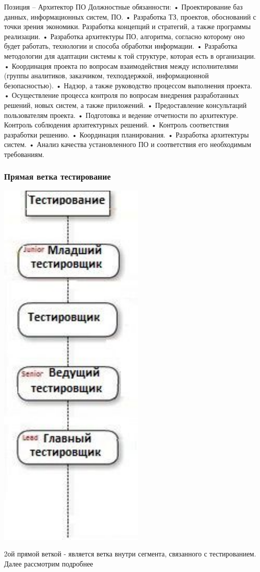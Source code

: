 \documentclass{../industrial-development}
\begin{document}
\lecturenotes
Позиция – Архитектор ПО
Должностные обязанности: 
•	Проектирование баз данных, информационных систем, ПО. 
•	Разработка ТЗ, проектов, обоснований с точки зрения экономики. Разработка концепций и стратегий, а также программы реализации. 
•	Разработка архитектуры ПО, алгоритма, согласно которому оно будет работать, технологии и способа обработки информации. 
•	Разработка методологии для адаптации системы к той структуре, которая есть в организации. 
•	Координация проекта по вопросам взаимодействия между исполнителями (группы аналитиков, заказчиком, техподдержкой, информационной безопасностью). 
•	Надзор, а также руководство процессом выполнения проекта. 
•	Осуществление процесса контроля по вопросам внедрения разработанных решений, новых систем, а также приложений. 
•	Предоставление консультаций пользователям проекта. 
•	Подготовка и ведение отчетности по архитектуре. Контроль соблюдения архитектурных решений.
•	 Контроль соответствия разработки решению. 
•	Координация планирования.
•	 Разработка архитектуры систем. 
•	Анализ качества установленного ПО и соответствия его необходимым требованиям. 


\begin{frame} \frametitle{Прямая ветка тестирование }
  \centerline{\includegraphics[width=0.27\linewidth]{11-IT-specialist's-way/sch11b.pdf}}
\end{frame}
\lecturenotes
 2ой прямой веткой  - является ветка внутри сегмента, связанного с тестированием. Далее рассмотрим подробнее
\end{document}
